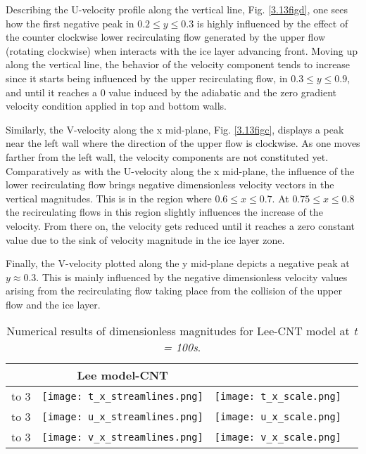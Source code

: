 \noindent Describing the U-velocity profile along the vertical line, Fig. \ref{3.13figd}, one sees how the first negative peak in $0.2 \leq y \leq 0.3$ is highly influenced by the effect of the counter clockwise lower recirculating flow generated by the upper flow (rotating clockwise) when interacts with the ice layer advancing front. Moving up along the vertical line, the behavior of the velocity component tends to increase since it starts being influenced by the upper recirculating flow, in $0.3 \leq y  \leq 0.9$, and until it reaches a 0 value induced by the adiabatic and the zero gradient velocity condition applied in top and bottom walls.

\noindent Similarly, the V-velocity along the x mid-plane, Fig. \ref{3.13figc}, displays a peak near the left wall where the direction of the upper flow is clockwise. As one moves farther from the left wall, the velocity components are not constituted yet. Comparatively as with the U-velocity along the x mid-plane, the influence of the lower recirculating flow brings negative dimensionless velocity vectors in the vertical magnitudes. This is in the region where $0.6 \leq x \leq 0.7$. At $0.75 \leq x \leq 0.8$ the recirculating flows in this region slightly influences the increase of the velocity. From there on, the velocity gets reduced until it reaches a zero constant value due to the sink of velocity magnitude in the ice layer zone.

\noindent Finally, the V-velocity plotted along the y mid-plane depicts a negative peak at $y \approx 0.3$. This is mainly influenced by the negative dimensionless velocity values arising from the recirculating flow taking place from the collision of the upper flow and the ice layer.

\begin{table}[h!]
	\begin{tabular}{@{}b{2cm}ccc@{}}
		\toprule[1pt]
		& 
		\multicolumn{1}{c}{\textbf{Lee model-CNT}} & \\ \midrule[2pt]
		\vbox to 3\baselineskip{\textbf{Temperature}}& \texttt{[image: t\_x\_streamlines.png]} & \texttt{[image: t\_x\_scale.png]} \\		
		\vbox to 3\baselineskip{\textbf{U-velocity}}&\texttt{[image: u\_x\_streamlines.png]} & \texttt{[image: u\_x\_scale.png]}\\
		\vbox to 3\baselineskip{\textbf{V-velocity}}& \texttt{[image: v\_x\_streamlines.png]} & \texttt{[image: v\_x\_scale.png]} \\	 \bottomrule[1pt]		
	\end{tabular}
	\centering
	\caption{Numerical results of dimensionless magnitudes for Lee-CNT model at \textit{t = 100s}.}	
	\label{3.15tab}
\end{table}


